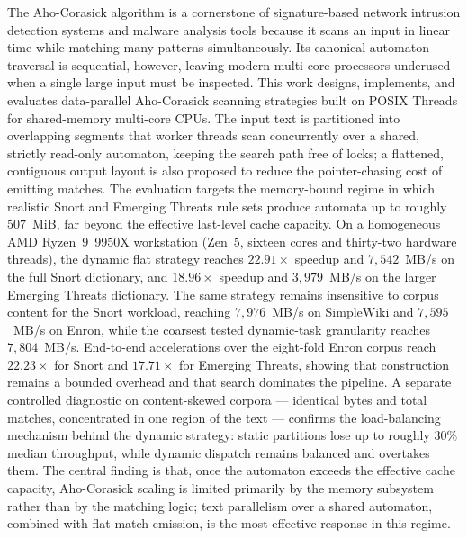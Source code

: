 The Aho-Corasick algorithm is a cornerstone of signature-based network
intrusion detection systems and malware analysis tools because it scans an input
in linear time while matching many patterns simultaneously. Its canonical
automaton traversal is sequential, however, leaving modern multi-core processors
underused when a single large input must be inspected. This work designs,
implements, and evaluates data-parallel Aho-Corasick scanning strategies built on
POSIX Threads for shared-memory multi-core CPUs. The input text is partitioned
into overlapping segments that worker threads scan concurrently over a shared,
strictly read-only automaton, keeping the search path free of locks; a flattened,
contiguous output layout is also proposed to reduce the pointer-chasing cost of
emitting matches. The evaluation targets the memory-bound regime in which
realistic Snort and Emerging Threats rule sets produce automata up to roughly
$507$~MiB, far beyond the effective last-level cache capacity. On a homogeneous
AMD Ryzen~9~9950X workstation (Zen~5, sixteen cores and thirty-two hardware
threads), the dynamic flat strategy reaches $22.91\times$ speedup and
$7{,}542$~MB/s on the full Snort dictionary, and $18.96\times$ speedup and
$3{,}979$~MB/s on the larger Emerging Threats dictionary. The same strategy
remains insensitive to corpus content for the Snort workload, reaching
$7{,}976$~MB/s on SimpleWiki and $7{,}595$~MB/s on Enron, while the coarsest
tested dynamic-task granularity reaches $7{,}804$~MB/s. End-to-end accelerations
over the eight-fold Enron corpus reach $22.23\times$ for Snort and
$17.71\times$ for Emerging Threats, showing that construction remains a bounded
overhead and that search dominates the pipeline. A separate controlled
diagnostic on content-skewed corpora --- identical bytes and total matches,
concentrated in one region of the text --- confirms the load-balancing mechanism
behind the dynamic strategy: static partitions lose up to roughly $30\%$
median throughput, while dynamic dispatch remains balanced and overtakes them.
The central finding is that,
once the automaton exceeds the effective cache capacity, Aho-Corasick scaling is
limited primarily by the memory subsystem rather than by the matching logic; text
parallelism over a shared automaton, combined with flat match emission, is the
most effective response in this regime.
